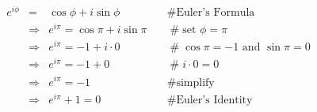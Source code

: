 \documentclass[11pt, oneside]{article}   	%
\begin{document}
\begin{equation*}
\begin{array}{lllll}
e^{i\phi}
&=&                   \cos \phi + i \sin \phi                    &\quad  \mathrel{\#} \text{Euler's Formula}                            \\
&\Rightarrow&  e^{i\pi} = \cos \pi + i \sin \pi          &\quad  \mathrel{\#} \text{set $\phi = \pi$}                              \\
&\Rightarrow&  e^{i\pi} = -1 + i \cdot 0                  &\quad  \mathrel{\#} \text{$\cos \pi = -1$ and $\sin \pi = 0$}  \\
&\Rightarrow&  e^{i\pi} = -1 + 0                            &\quad  \mathrel{\#} i \cdot 0 = 0                                            \\
&\Rightarrow&  e^{i\pi} = -1                                  &\quad  \mathrel{\#} \text{simplify}                                          \\
&\Rightarrow&  e^{i\pi} +1 = 0                              &\quad  \mathrel{\#} \text{Euler's Identity} 
\end{array}
\end{equation*}
\end{document}
